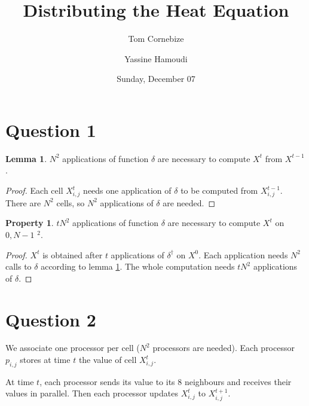 \documentclass[a4paper,10pt]{article} %
\title{Distributing the Heat Equation}
\author{Tom Cornebize \and Yassine Hamoudi}
\date{Sunday, December 07}
\theoremstyle{definition} %
\newtheorem{prop}[thm]{Property}
\newtheorem{lem}[thm]{Lemma}
\newcommand{\ddelta}{\delta^\dag}
\begin{document}
\maketitle


\section{Question 1}

\begin{lem}
  \label{nextStep}
  $N^2$ applications of function $\delta$ are necessary to compute $X^t$ from $X^{t-1}$.
\end{lem}

\begin{proof}
 Each cell $X^{t}_{i,j}$ needs one application of $\delta$ to be computed from $X^{t-1}_{i,j}$. There are $N^2$ cells, so $N^2$ applications of $\delta$ are needed.
\end{proof}

\begin{prop}
  $tN^2$ applications of function $\delta$ are necessary to compute $X^t$ on \textlbrackdbl $0,N-1$ \textrbrackdbl$^2$.
\end{prop}

\begin{proof}
 $X^t$ is obtained after $t$ applications of $\ddelta$ on $X^0$. Each application needs $N^2$ calls to $\delta$ according to lemma \ref{nextStep}. The whole computation needs $tN^2$ applications of $\delta$.
\end{proof}


\section{Question 2}

We associate one processor per cell ($N^2$ processors are needed). Each processor $p_{i,j}$ stores at time $t$ the value of cell $X^{t}_{i,j}$.

At time $t$, each processor sends its value to its 8 neighbours and receives their values in parallel. Then each processor updates $X^{t}_{i,j}$ to $X^{t+1}_{i,j}$. 
\end{document}

